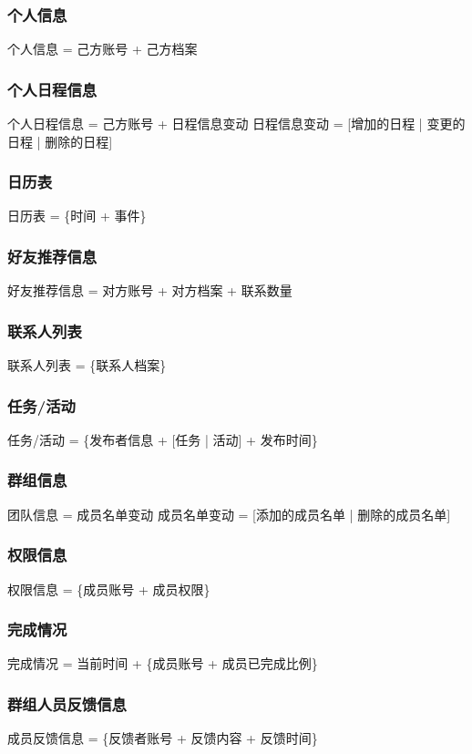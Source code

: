             \subsubsection{个人信息}
                个人信息 = 己方账号 + 己方档案
            \subsubsection{个人日程信息}
                个人日程信息 = 己方账号 + 日程信息变动
                日程信息变动 = [增加的日程 | 变更的日程 | 删除的日程]
            \subsubsection{日历表}
                日历表 = \{时间 + 事件\}
            \subsubsection{好友推荐信息}
                好友推荐信息 = 对方账号 + 对方档案 + 联系数量
            \subsubsection{联系人列表}
                联系人列表 = \{联系人档案\}
            \subsubsection{任务/活动}
                任务/活动 = \{发布者信息 + [任务 | 活动] + 发布时间\}
            \subsubsection{群组信息}
                团队信息 = 成员名单变动
                成员名单变动 = [添加的成员名单 | 删除的成员名单]
            \subsubsection{权限信息}
                权限信息 = \{成员账号 + 成员权限\}
            \subsubsection{完成情况}
                完成情况 = 当前时间 + \{成员账号 + 成员已完成比例\}
            \subsubsection{群组人员反馈信息}
                成员反馈信息 = \{反馈者账号 + 反馈内容 + 反馈时间\}
